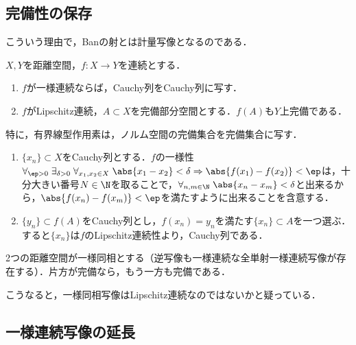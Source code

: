 \documentclass[uplatex,dvipdfmx]{jsreport}
\begin{document}
\subsection{完備性の保存}

\begin{tcolorbox}[colframe=ForestGreen, colback=ForestGreen!10!white,breakable,colbacktitle=ForestGreen!40!white,coltitle=black,fonttitle=\bfseries\sffamily,
title=]
    こういう理由で，Banの射とは計量写像となるのである．
\end{tcolorbox}

\begin{proposition}
    $X,Y$を距離空間，$f:X\to Y$を連続とする．
    \begin{enumerate}
        \item $f$が一様連続ならば，Cauchy列をCauchy列に写す．
        \item $f$がLipschitz連続，$A\subset X$を完備部分空間とする．$f(A)$も$Y$上完備である．
    \end{enumerate}
    特に，有界線型作用素は，ノルム空間の完備集合を完備集合に写す．
\end{proposition}
\begin{Proof}\mbox{}
    \begin{enumerate}
        \item $\{x_n\}\subset X$をCauchy列とする．$f$の一様性$\forall_{\ep>0}\;\exists_{\delta>0}\;\forall_{x_1,x_2\in X}\;\abs{x_1-x_2}<\delta\Rightarrow\abs{f(x_1)-f(x_2)}<\ep$は，十分大きい番号$N\in\N$を取ることで，$\forall_{n,m\in\N}\;\abs{x_n-x_m}<\delta$と出来るから，$\abs{f(x_n)-f(x_m)}<\ep$を満たすように出来ることを含意する．
        \item $\{y_n\}\subset f(A)$をCauchy列とし，$f(x_n)=y_n$を満たす$\{x_n\}\subset A$を一つ選ぶ．
        すると$\{x_n\}$は$f$のLipschitz連続性より，Cauchy列である．
    \end{enumerate}
\end{Proof}

\begin{theorem}
    2つの距離空間が一様同相とする（逆写像も一様連続な全単射一様連続写像が存在する）．片方が完備なら，もう一方も完備である．
\end{theorem}
\begin{remarks}
    こうなると，一様同相写像はLipschitz連続なのではないかと疑っている．
\end{remarks}

\subsection{一様連続写像の延長}
\end{document}
